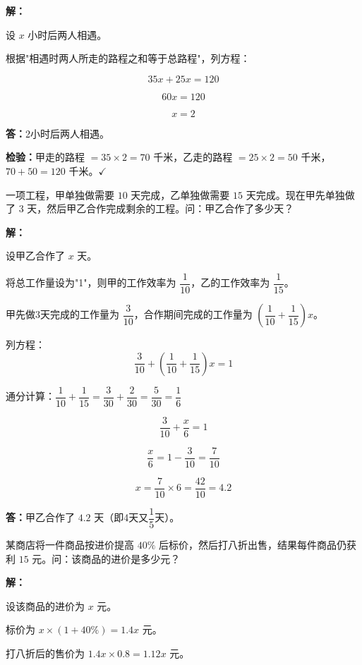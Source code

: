 \documentclass[12pt, a4paper]{ctexart}
\begin{document}
\textbf{解：}

设 $x$ 小时后两人相遇。

根据"相遇时两人所走的路程之和等于总路程"，列方程：

$$35x+25x=120$$

$$60x=120$$

$$x=2$$

\textbf{答：}2小时后两人相遇。

\textbf{检验：}甲走的路程 $=35\times 2=70$ 千米，乙走的路程 $=25\times 2=50$ 千米，$70+50=120$ 千米。$\checkmark$

\vspace{6pt}

\begin{appbox}[【应用2】工程问题]
一项工程，甲单独做需要 $10$ 天完成，乙单独做需要 $15$ 天完成。现在甲先单独做了 $3$ 天，然后甲乙合作完成剩余的工程。问：甲乙合作了多少天？
\end{appbox}

\textbf{解：}

设甲乙合作了 $x$ 天。

将总工作量设为"1"，则甲的工作效率为 $\dfrac{1}{10}$，乙的工作效率为 $\dfrac{1}{15}$。

甲先做3天完成的工作量为 $\dfrac{3}{10}$，合作期间完成的工作量为 $\left(\dfrac{1}{10}+\dfrac{1}{15}\right)x$。

列方程：
$$\frac{3}{10}+\left(\frac{1}{10}+\frac{1}{15}\right)x=1$$

通分计算：$\dfrac{1}{10}+\dfrac{1}{15}=\dfrac{3}{30}+\dfrac{2}{30}=\dfrac{5}{30}=\dfrac{1}{6}$

$$\frac{3}{10}+\frac{x}{6}=1$$

$$\frac{x}{6}=1-\frac{3}{10}=\frac{7}{10}$$

$$x=\frac{7}{10}\times 6=\frac{42}{10}=4.2$$

\textbf{答：}甲乙合作了 $4.2$ 天（即4天又$\dfrac{1}{5}$天）。

\vspace{6pt}

\begin{appbox}[【应用3】利润问题]
某商店将一件商品按进价提高 $40\%$ 后标价，然后打八折出售，结果每件商品仍获利 $15$ 元。问：该商品的进价是多少元？
\end{appbox}

\textbf{解：}

设该商品的进价为 $x$ 元。

标价为 $x\times(1+40\%)=1.4x$ 元。

打八折后的售价为 $1.4x\times 0.8=1.12x$ 元。
\end{document}
